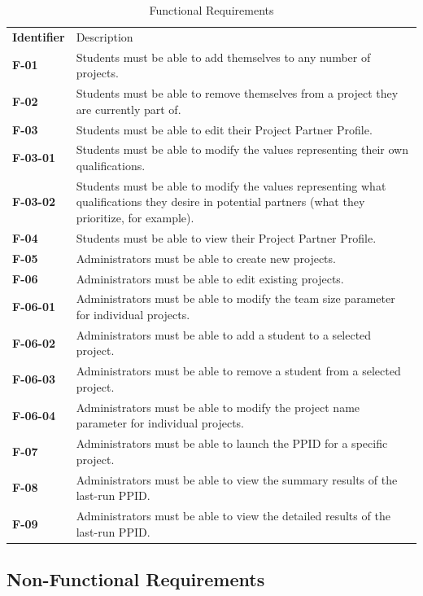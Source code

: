 \documentclass[12pt,letterpaper]{article}
\begin{document}
\begin{table}[H]
	\caption{Functional Requirements}
	\vspace{1em}
	\begin{tabu} to 
	    \tableheader{}Identifier & Description\\
		F-01 & Students must be able to add themselves to any number of projects. \\
		F-02 & Students must be able to remove themselves from a project they are currently part of. \\
		F-03 & Students must be able to edit their Project Partner Profile. \\
		\ccindent{}F-03-01 & \ccindent{}Students must be able to modify the values representing their own qualifications. \\
		\ccindent{}F-03-02 & \ccindent{}Students must be able to modify the values representing what qualifications they
		desire in potential partners (what they prioritize, for example). \\
		F-04 & Students must be able to view their Project Partner Profile. \\
		F-05 & Administrators must be able to create new projects. \\
		F-06 & Administrators must be able to edit existing projects. \\
		\ccindent{}F-06-01 & \ccindent{}Administrators must be able to modify the team size parameter for individual projects. \\
		\ccindent{}F-06-02 & \ccindent{}Administrators must be able to add a student to a selected project. \\
		\ccindent{}F-06-03 & \ccindent{}Administrators must be able to remove a student from a selected project. \\
		\ccindent{}F-06-04 & \ccindent{}Administrators must be able to modify the project name parameter for individual projects.\\
		F-07 & Administrators must be able to launch the PPID for a specific project. \\
		F-08 & Administrators must be able to view the summary results of the last-run PPID. \\
		F-09 & Administrators must be able to view the detailed results of the last-run PPID. \\
	\end{tabu}
\end{table}

\vspace{1em}
\subsection{Non-Functional Requirements}
\end{document}
